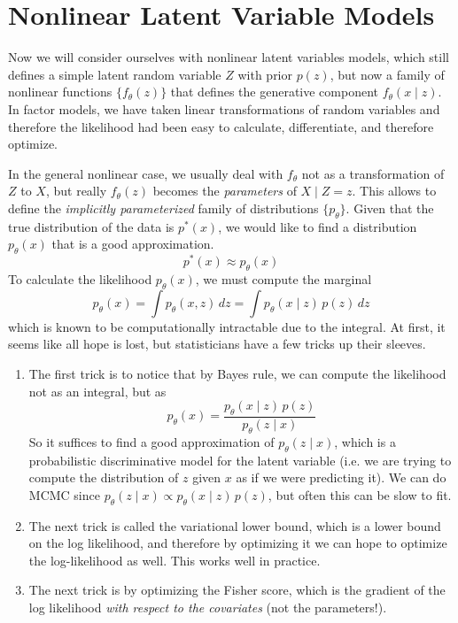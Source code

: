 \documentclass{article}
\begin{document}
\section{Nonlinear Latent Variable Models}

  Now we will consider ourselves with nonlinear latent variables models, which still defines a simple latent random variable $Z$ with prior $p(z)$, but now a family of nonlinear functions $\{f_\theta (z)\}$ that defines the generative component $f_\theta (x \mid z)$. In factor models, we have taken linear transformations of random variables and therefore the likelihood had been easy to calculate, differentiate, and therefore optimize. 

  In the general nonlinear case, we usually deal with $f_\theta$ not as a transformation of $Z$ to $X$, but really $f_\theta (z)$ becomes the \textit{parameters} of $X \mid Z = z$. This allows to define the \textit{implicitly parameterized} family of distributions $\{p_\theta\}$. Given that the true distribution of the data is $p^\ast (x)$, we would like to find a distribution $p_\theta (x)$ that is a good approximation. 
  \begin{equation}
    p^\ast (x) \approx p_\theta (x)
  \end{equation}
  To calculate the likelihood $p_\theta (x)$, we must compute the marginal 
  \begin{equation}
    p_\theta (x) = \int p_\theta (x, z) \,dz = \int p_\theta (x \mid z) \, p(z) \,dz
  \end{equation}
  which is known to be computationally intractable due to the integral. At first, it seems like all hope is lost, but statisticians have a few tricks up their sleeves. 
  \begin{enumerate} 
    \item The first trick is to notice that by Bayes rule, we can compute the likelihood not as an integral, but as 
    \begin{equation}
      p_\theta (x) = \frac{p_\theta (x \mid z) \, p(z)}{p_\theta (z \mid x)} 
    \end{equation}
    So it suffices to find a good approximation of $p_\theta (z \mid x)$, which is a probabilistic discriminative model for the latent variable (i.e. we are trying to compute the distribution of $z$ given $x$ as if we were predicting it). We can do MCMC since $p_\theta (z \mid x) \propto p_\theta (x \mid z) \, p(z)$, but often this can be slow to fit. 

    \item The next trick is called the variational lower bound, which is a lower bound on the log likelihood, and therefore by optimizing it we can hope to optimize the log-likelihood as well. This works well in practice. 

    \item The next trick is by optimizing the Fisher score, which is the gradient of the log likelihood \textit{with respect to the covariates} (not the parameters!). 
  \end{enumerate}
\end{document}
